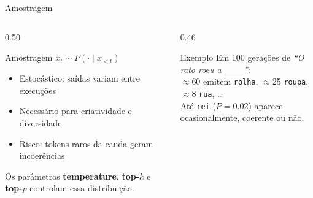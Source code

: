 \documentclass[aspectratio=169, xcolor=dvipsnames]{beamer}
\begin{document}
  \begin{frame}{Amostragem}
    \begin{columns}[T]
      \begin{column}{0.50\textwidth}
        \begin{block}{Amostragem}
          $x_t \sim P(\cdot \mid x_{<t})$
        \end{block}
        \vspace{0.3em}
        \begin{itemize}
          \item Estocástico: saídas variam entre execuções
          \item Necessário para criatividade e diversidade
          \item Risco: tokens raros da cauda geram incoerências
        \end{itemize}
        \vspace{0.3em}
        Os parâmetros \textbf{temperature}, \textbf{top-$k$} e \textbf{top-$p$} controlam essa distribuição.
      \end{column}
      \begin{column}{0.46\textwidth}
        \begin{exampleblock}{Exemplo}
          Em 100 gerações de \textit{``O rato roeu a \_\_\_''}:\\[0.2em]
          $\approx$60 emitem \texttt{rolha}, $\approx$25 \texttt{roupa}, $\approx$8 \texttt{rua}, \ldots\\[0.2em]
          Até \texttt{rei} ($P = 0.02$) aparece ocasionalmente, coerente ou não.
        \end{exampleblock}
      \end{column}
    \end{columns}
  \end{frame}
\end{document}
